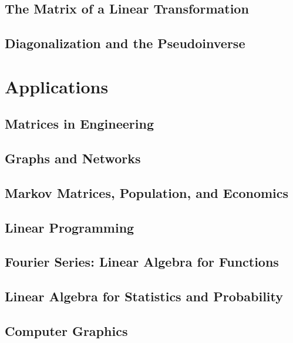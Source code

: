 \documentclass{book}
\begin{document}
\section{The Matrix of a Linear Transformation}

\section{Diagonalization and the Pseudoinverse}









\chapter{Applications}
\section{Matrices in Engineering}

\section{Graphs and Networks}

\section{Markov Matrices, Population, and Economics}

\section{Linear Programming}

\section{Fourier Series: Linear Algebra for Functions}

\section{Linear Algebra for Statistics and Probability}

\section{Computer Graphics}
\end{document}
